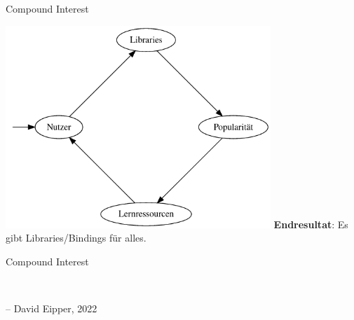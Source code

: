 \documentclass{beamer}
\begin{document}
\begin{frame}{Compound Interest}
\begin{center}
\includegraphics[width=100mm]{assets/circle.png}
\textbf{Endresultat}: Es gibt Libraries/Bindings f\"ur alles.
\end{center}
\end{frame}

\begin{frame}{Compound Interest}
\begin{center}
{ \large {}}\\
\end{center}
-- David Eipper, 2022
\end{frame}
\end{document}
